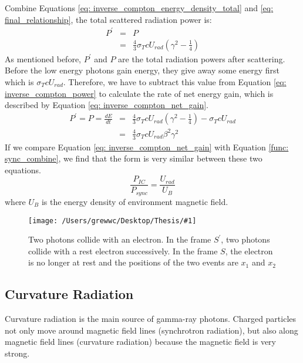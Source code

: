 \documentclass[12pt]{report}
\newcommand{\singleFig}[3]{
  \begin{figure}[!htp]
    \centering
    \texttt{[image: /Users/grewwc/Desktop/Thesis/\#1]}
    \caption{#3}
    \label{fig: #1}
  \end{figure}
}
\newcommand{\add}[1]{
  $<$\colorbox{red}{\textbf{add}}$>$#1$<$\colorbox{red}{\textbf{/add}}$>$
}
\begin{document}
            Combine Equations \ref{eq: inverse_compton_energy_density_total} and 
            \ref{eq: final_relationship}, the total scattered radiation power is:
            \begin{eqnarray}
              \label{eq: inverse_compton_power}
              P^{\prime} &=& P  \nonumber \\
                        &=& \frac{4}{3} \sigma_{T} c U_{rad} \left(\gamma^2 - \frac{1}{4}\right)
            \end{eqnarray}
            As mentioned before, $P^{\prime}$ and $P$ are the total radiation powers after 
            scattering. Before the low energy photons gain energy, they give away some energy 
            first which is $\sigma_{T} c U_{rad}$. 
            Therefore, we have to subtract this value from Equation \ref{eq: inverse_compton_power} 
            to calculate the rate of net energy gain, which is described by Equation 
            \ref{eq: inverse_compton_net_gain}.
            \begin{eqnarray}
              \label{eq: inverse_compton_net_gain}
              P^{\prime} = P = \frac{dE}{dt} &=& \frac{4}{3} \sigma_{T} c U_{rad} \left(\gamma^2 - \frac{1}{4}\right) - \sigma_{T} c U_{rad} \nonumber \\
                                            &=& \frac{4}{3} \sigma_{T} c U_{rad} \beta^{2} \gamma^{2}
            \end{eqnarray}
            If we compare Equation \ref{eq: inverse_compton_net_gain} with 
            Equation \ref{func: sync_combine}, we find that the form is very similar between these 
            two equations. 
            \begin{equation}
              \label{eq: comparision_inverse_compton_and_sync}
              \frac{P_{IC}}{P_{sync}} = \frac{U_{rad}}{U_{B}}
            \end{equation}
            where $U_{B}$ is the energy density of environment magnetic field. 

            \vspace{1cm}
            \singleFig{inverse_compton_time_interval}{0.45}{Two photons collide with an 
              electron. In the frame $S^{\prime}$, two photons collide with a rest electron 
              successively. In the frame $S$, the electron is no longer at rest and the 
              positions of the two events are $x_1$ and $x_2$}
        
        \subsection{Curvature Radiation}
          Curvature radiation is the main source of gamma-ray photons. Charged particles  
          not only move around magnetic field lines (synchrotron radiation), 
          but also along magnetic field lines (curvature radiation) because the magnetic 
          field is very strong.
\end{document}
